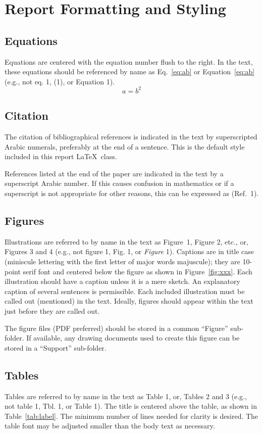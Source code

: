 \documentclass[]{AVSSimReportMemo}
\begin{document}
\section{Report Formatting and Styling}
\subsection{Equations}
Equations are centered with the equation number flush to the right. In the text, these equations should be referenced by name as Eq.~\eqref{eq:ab} or Equation~\eqref{eq:ab} (e.g., not eq.  1, (1), or Equation 1).
\begin{equation}
	\label{eq:ab}
	a = b^{2}
\end{equation}


\subsection{Citation}
The citation of bibliographical references is indicated in the text by superscripted Arabic numerals, preferably at the end of a sentence.  This is the default style included in this report \LaTeX\ class.

References listed at the end of the paper are indicated in the text by a superscript Arabic number. If this causes confusion in mathematics or if a superscript is not appropriate for other reasons, this can be expressed as (Ref.~1).  

\subsection{Figures}
Illustrations are referred to by name in the text as Figure~1, Figure 2, etc., or, Figures 3 and 4 (e.g., not figure 1, Fig. 1, or \emph{Figure} 1). Captions are in title case (miniscule lettering with the first letter of major words majuscule); they are 10-point serif font and centered below the figure as shown in Figure~\ref{fig:xxx}. Each illustration should have a caption unless it is a mere sketch. An explanatory caption of several sentences is permissible. Each included illustration must be called out (mentioned) in the text. Ideally, figures should appear within the text just before they are called out. 

The figure files (PDF preferred) should be stored in a common ``Figure'' sub-folder.  If available, any drawing documents used to create this figure can be stored in a ``Support'' sub-folder.



\subsection{Tables}
Tables are referred to by name in the text as Table 1, or, Tables 2 and 3 (e.g., not table 1, Tbl. 1, or Table 1). The title is centered above the table, as shown in Table~\ref{tab:label}. The minimum number of lines needed for clarity is desired. The table font may be adjusted smaller than the body text as necessary.
\end{document}

